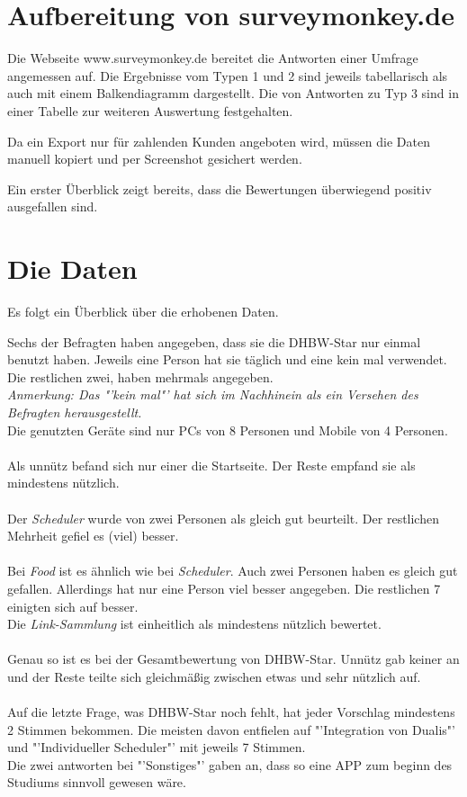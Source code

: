 \section{Aufbereitung von surveymonkey.de}
Die Webseite www.surveymonkey.de bereitet die Antworten einer Umfrage angemessen auf. Die Ergebnisse vom Typen 1 und 2 sind jeweils tabellarisch als auch mit einem Balkendiagramm dargestellt.
Die von Antworten zu Typ 3 sind in einer Tabelle zur weiteren Auswertung festgehalten.

Da ein Export nur für zahlenden Kunden angeboten wird, müssen die Daten manuell kopiert und per Screenshot gesichert werden.

Ein erster Überblick zeigt bereits, dass die Bewertungen überwiegend positiv ausgefallen sind.
\newpage
\section{Die Daten }
Es folgt ein Überblick über die erhobenen Daten.

Sechs der Befragten haben angegeben, dass sie die DHBW-Star nur einmal benutzt haben.
Jeweils eine Person hat sie täglich und eine kein mal verwendet.
Die restlichen zwei, haben mehrmals angegeben. \\
\emph{Anmerkung: Das "'kein mal"' hat sich im Nachhinein als ein Versehen des Befragten herausgestellt. }
\\
Die genutzten Geräte sind nur PCs von 8 Personen und Mobile von 4 Personen. \\
\\
Als unnütz befand sich nur einer die Startseite. Der Reste empfand sie als mindestens nützlich. \\
\\
Der \emph{Scheduler} wurde von zwei Personen als gleich gut beurteilt. Der restlichen Mehrheit gefiel es (viel) besser. \\
\\
Bei \emph{Food} ist es ähnlich wie bei \emph{Scheduler}. Auch zwei Personen haben es gleich gut gefallen. Allerdings hat nur eine Person viel besser angegeben. Die restlichen 7 einigten sich auf besser.
\\
Die \emph{Link-Sammlung} ist einheitlich als mindestens nützlich bewertet. \\
\\
Genau so ist es bei der Gesamtbewertung von DHBW-Star. Unnütz gab keiner an und der Reste teilte sich gleichmäßig zwischen etwas und sehr nützlich auf. \\
\\
Auf die letzte Frage, was DHBW-Star noch fehlt, hat jeder Vorschlag mindestens 2 Stimmen bekommen. Die meisten davon entfielen auf "'Integration von Dualis"' und "'Individueller Scheduler"' mit jeweils 7 Stimmen.\\
Die zwei antworten bei "'Sonstiges"' gaben an, dass so eine APP zum beginn des Studiums sinnvoll gewesen wäre. 
\newpage
